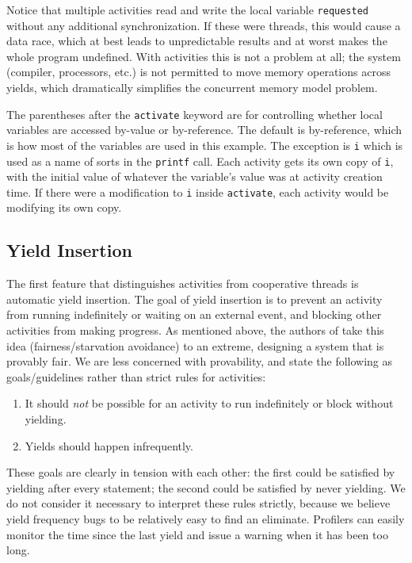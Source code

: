 \documentclass[pldi,10pt,preprint]{sigplanconf-pldi16}
\begin{document}
Notice that multiple activities read and write the local variable \texttt{requested} without any additional synchronization.
If these were threads, this would cause a data race, which at best leads to unpredictable results and at worst makes the whole program undefined.
With activities this is not a problem at all; the system (compiler, processors, etc.) is not permitted to move memory operations across yields, which dramatically simplifies the concurrent memory model problem.

The parentheses after the \texttt{activate} keyword are for controlling whether local variables are accessed by-value or by-reference.
The default is by-reference, which is how most of the variables are used in this example.
The exception is \texttt{i} which is used as a name of sorts in the \texttt{printf} call.
Each activity gets its own copy of \texttt{i}, with the initial value of whatever the variable's value was at activity creation time.
If there were a modification to \texttt{i} inside \texttt{activate}, each activity would be modifying its own copy.

\subsection{Yield Insertion}

The first feature that distinguishes activities from cooperative threads is automatic yield insertion.
The goal of yield insertion is to prevent an activity from running indefinitely or waiting on an external event, and blocking other activities from making progress.
As mentioned above, the authors of \cite{Boudol2007} take this idea (fairness/starvation avoidance) to an extreme, designing a system that is provably fair.
We are less concerned with provability, and state the following as goals/guidelines rather than strict rules for activities:

\begin{enumerate}
\item It should \emph{not} be possible for an activity to run indefinitely or block without yielding.
\item Yields should happen infrequently.
\end{enumerate}

These goals are clearly in tension with each other: the first could be satisfied by yielding after every statement; the second could be satisfied by never yielding.
We do not consider it necessary to interpret these rules strictly, because we believe yield frequency bugs to be relatively easy to find an eliminate.
Profilers can easily monitor the time since the last yield and issue a warning when it has been too long.
\end{document}
